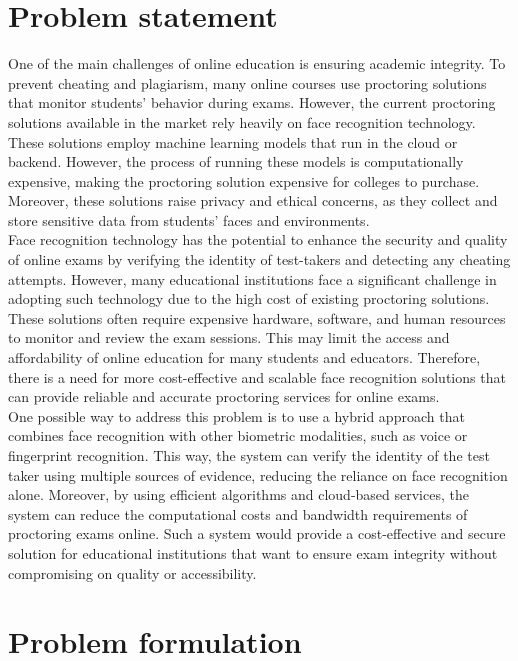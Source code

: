 \documentclass[journal]{IEEEtran}
\begin{document}
\section{Problem statement }
One of the main challenges of online education is ensuring academic integrity. To prevent cheating and plagiarism, many online courses use proctoring solutions that monitor students' behavior during exams. However, the current proctoring solutions available in the market rely heavily on face recognition technology. These solutions employ machine learning models that run in the cloud or backend. However, the process of running these models is computationally expensive, making the proctoring solution expensive for colleges to purchase. Moreover, these solutions raise privacy and ethical concerns, as they collect and store sensitive data from students' faces and environments.\\

 
Face recognition technology has the potential to enhance the security and quality of online exams by verifying the identity of test-takers and detecting any cheating attempts. However, many educational institutions face a significant challenge in adopting such technology due to the high cost of existing proctoring solutions. These solutions often require expensive hardware, software, and human resources to monitor and review the exam sessions. This may limit the access and affordability of online education for many students and educators. Therefore, there is a need for more cost-effective and scalable face recognition solutions that can provide reliable and accurate proctoring services for online exams.\\

One possible way to address this problem is to use a hybrid approach that combines face recognition with other biometric modalities, such as voice or fingerprint recognition. This way, the system can verify the identity of the test taker using multiple sources of evidence, reducing the reliance on face recognition alone. Moreover, by using efficient algorithms and cloud-based services, the system can reduce the computational costs and bandwidth requirements of proctoring exams online. Such a system would provide a cost-effective and secure solution for educational institutions that want to ensure exam integrity without compromising on quality or accessibility.

\section{Problem formulation }
\end{document}
